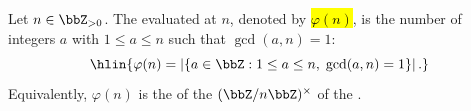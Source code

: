 \begin{definition} \label{definition:euler_totient_function}
    Let $n \in \bbZ_{>0}$. The  evaluated at $n$, denoted by \hl{$\varphi(n)$}, is the number of integers $a$ with $1 \leq a \leq n$ such that $\gcd(a, n) = 1$:
    $$\hlin{\varphi(n) = \left| \{ a \in \bbZ : 1 \leq a \leq n,\; \gcd(a, n) = 1 \} \right|.}$$
    Equivalently, $\varphi(n)$ is the  of the  $(\bbZ / n\bbZ)^\times$ of the .
\end{definition}
